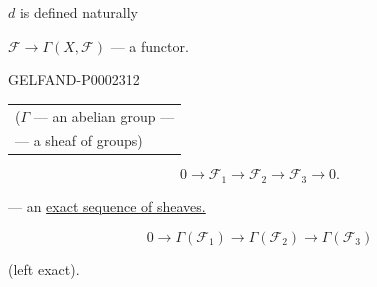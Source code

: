 $d$ is defined naturally



$\mathcal F\to\Gamma (X,\mathcal F)$ — a functor.



\begin{GelfandAdjacentEvidence}{GELFAND-P000231}{2}
\begin{center}
\begin{tabular}{l}
($\Gamma$ — an abelian group —\\
\hspace{12mm}— a sheaf of groups)
\end{tabular}
\end{center}
\end{GelfandAdjacentEvidence}

\begin{equation*}
 0\to\mathcal F_1\to\mathcal F_2\to\mathcal F_3\to0.
\end{equation*}



— an \underline{exact sequence of sheaves.}



\begin{equation*}
 0\to\Gamma (\mathcal F_1)\to\Gamma (\mathcal F_2)\to\Gamma (\mathcal F_3)
\end{equation*}



(left exact).



